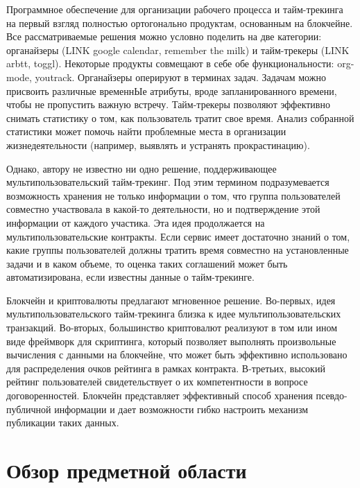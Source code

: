 \documentclass[]{itmo-student-thesis}
\begin{document}
Программное обеспечение для организации рабочего процесса и
тайм-трекинга на первый взгляд полностью ортогонально продуктам,
основанным на блокчейне. Все рассматриваемые решения можно условно
поделить на две категории: органайзеры (LINK google calendar, remember
the milk) и тайм-трекеры (LINK arbtt, toggl). Некоторые продукты
совмещают в себе обе функциональности: org-mode, youtrack. Органайзеры
оперируют в терминах задач. Задачам можно присвоить различные
временнЫе атрибуты, вроде запланированного времени, чтобы не
пропустить важную встречу. Тайм-трекеры позволяют эффективно снимать
статистику о том, как пользователь тратит свое время. Анализ собранной
статистики может помочь найти проблемные места в организации
жизнедеятельности (например, выявлять и устранять прокрастинацию).

Однако, автору не известно ни одно решение, поддерживающее
мультипользовательский тайм-трекинг. Под этим термином подразумевается
возможность хранения не только информации о том, что группа
пользователей совместно участвовала в какой-то деятельности, но и
подтверждение этой информации от каждого участика. Эта идея
продолжается на мультипользовательские контракты. Если сервис имеет
достаточно знаний о том, какие группы пользователей должны тратить
время совместно на установленные задачи и в каком объеме, то оценка
таких соглашений может быть автоматизирована, если известны данные о
тайм-трекинге.

Блокчейн и криптовалюты предлагают мгновенное решение. Во-первых, идея
мультипользовательского тайм-трекинга близка к идее
мультипользовательских транзакций. Во-вторых, большинство криптовалют
реализуют в том или ином виде фреймворк для скриптинга, который
позволяет выполнять произвольные вычисления с данными на блокчейне,
что может быть эффективно использовано для распределения очков
рейтинга в рамках контракта. В-третьих, высокий рейтинг пользователей
свидетельствует о их компетентности в вопросе
договоренностей. Блокчейн представляет эффективный способ хранения
псевдо-публичной информации и дает возможности гибко настроить
механизм публикации таких данных.

\chapter{Обзор предметной области}

\end{document}
